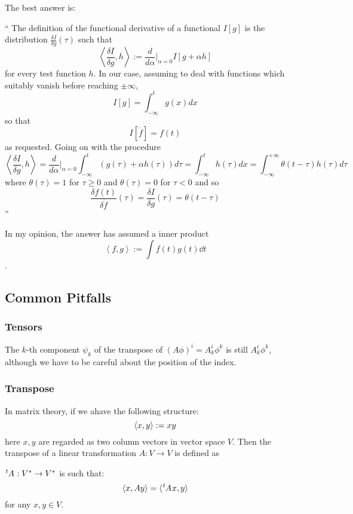 The best answer is:
\begin{myquote} \enquote{
    The definition of the functional derivative of a functional $I[g]$ is the
    distribution $\frac{\delta I}{\delta g}(\tau)$ such that 
    $$\left\langle \frac{\delta I}{\delta g}, h\right\rangle 
        := \frac{d}{d\alpha}\bigg\rvert_{\alpha=0} I[g+ \alpha h]$$
    for every test function $h$. In our case, assuming to deal with functions which
    suitably vanish before reaching $\pm \infty$,
    $$I[g] = \int_{-\infty}^t g(x)dx$$
    so that
    $$I[\dot{f}]= f(t)$$
    as requested. Going on with the procedure
    $$\left\langle \frac{\delta I}{\delta g}, h\right\rangle 
        = \frac{d}{d\alpha}|_{\alpha=0}  \int_{-\infty}^t(g(\tau)+ \alpha h(\tau)) d\tau 
        = \int_{-\infty}^t h(\tau) dx 
        = \int_{-\infty}^{+\infty} \theta(t-\tau)h(\tau) d\tau
    $$
    where $\theta(\tau)=1$ for $\tau\geq 0$ and $\theta(\tau)=0$ for $\tau<0$
    and so 
$$\frac{\delta f(t)}{\delta \dot{f}}(\tau) = \frac{\delta I}{\delta g}(\tau)= \theta(t-\tau)$$
} \end{myquote}
In my opinion, the answer has assumed a inner product 
$$\left\langle f,g \right\rangle := \int f(t)g(t)\dd{t}$$.

\subsection{Common Pitfalls}
\label{sec:Common Pitfalls}
    \subsubsection{Tensors}
    \label{sec:Tensors}
    
    The $k$-th component $\psi_k$ of the transpose of $(A\phi)^i = A^i_k
    \phi^k$ is still $A^i_k \phi^k$, although we have to be careful about
    the position of the index.

    \subsubsection{Transpose}
    \label{sec:Transpose}
    
    In matrix theory, if we ahave the following structure:
    $$\braket{x,y} := x y$$
    here $x,y$ are regarded as two column vectors in vector space $V$.
    Then the transpose of a linear transformation $A:V\to V$ is defined
    as
    \begin{defi}[Transpose]
        $\tensor[^t]{A}{}:V^* \to V^*$ is such that:
        \begin{equation}
            \braket{x,Ay} = \braket{\tensor[^t]{A}{}x,y}
        \end{equation}
        for any $x,y\in V$.
    \end{defi}

